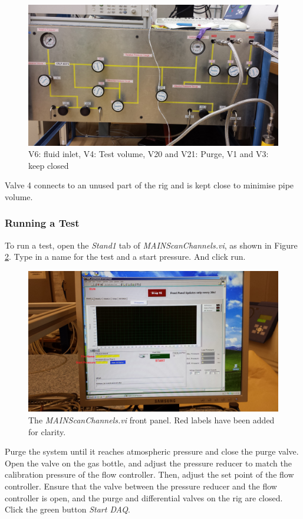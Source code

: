 \documentclass{report}
\begin{document}
\begin{figure}[h] 
\includegraphics[width=\textwidth]{valves}
\caption{V6: fluid inlet, V4: Test volume, V20 and V21: Purge, V1 and V3: keep closed}
\label{valves}
\end{figure}

Valve 4 connects to an unused part of the rig and is kept close to minimise pipe volume.\\
\subsubsection{Running a Test}
To run a test, open the \textit{Stand1} tab of \textit{MAIN\textunderscore ScanChannels.vi}, as shown in Figure \ref{labVIEW}. Type in a name for the test and a start pressure. And click run. 
\begin{figure}[h]
\includegraphics[width =\textwidth]{labVIEW}
\caption{The \textit{MAIN\textunderscore ScanChannels.vi} front panel. Red labels have been added for clarity.}
\label{labVIEW}
\end{figure}
Purge the system until it reaches atmospheric pressure and close the purge valve. Open the valve on the gas bottle, and adjust the pressure reducer to match the calibration pressure of the flow controller. Then, adjust the set point of the flow controller. Ensure that the valve between the pressure reducer and the flow controller is open, and the purge and differential valves on the rig are closed. Click the green button \textit{Start DAQ}.
\end{document}
